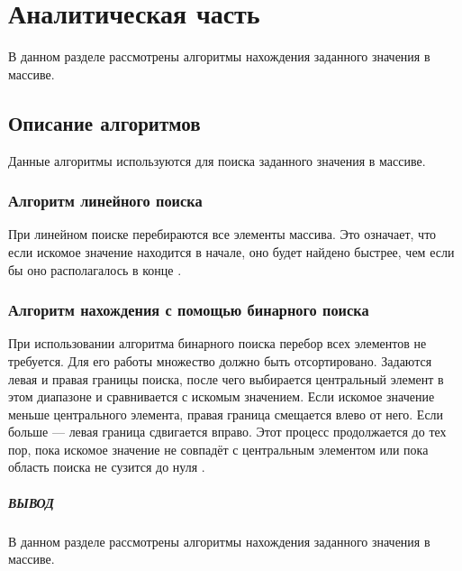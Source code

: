 \chapter{Аналитическая часть}

В данном разделе рассмотрены алгоритмы нахождения заданного значения в массиве\cite{search_algs}.

\section{Описание алгоритмов}

Данные алгоритмы используются для поиска заданного значения в массиве.

\subsection{Алгоритм линейного поиска}

При линейном поиске перебираются все элементы массива. Это означает, что если искомое значение находится в начале, оно будет найдено быстрее, чем если бы оно располагалось в конце \cite{lin_search_alg}.


\subsection{Алгоритм нахождения с помощью бинарного поиска}

При использовании алгоритма бинарного поиска перебор всех элементов не требуется. Для его работы множество должно быть отсортировано. Задаются левая и правая границы поиска, после чего выбирается центральный элемент в этом диапазоне и сравнивается с искомым значением. Если искомое значение меньше центрального элемента, правая граница смещается влево от него. Если больше — левая граница сдвигается вправо. Этот процесс продолжается до тех пор, пока искомое значение не совпадёт с центральным элементом или пока область поиска не сузится до нуля \cite{bin_search_alg}.

\clearpage

\paragraph*{ВЫВОД} ${}$ \\

В данном разделе рассмотрены алгоритмы нахождения заданного значения в массиве.
